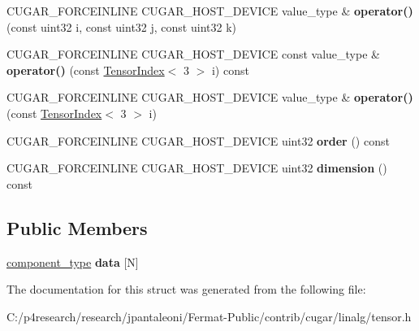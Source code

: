 \begin{DoxyCompactItemize}
\mbox{\label{structcugar_1_1_tensor_3_01_t_00_013_00_01_n_01_4_a6e31d653b9391e5c18a2f27902b9b14d}} 
C\+U\+G\+A\+R\+\_\+\+F\+O\+R\+C\+E\+I\+N\+L\+I\+NE C\+U\+G\+A\+R\+\_\+\+H\+O\+S\+T\+\_\+\+D\+E\+V\+I\+CE value\+\_\+type \& {\bfseries operator()} (const uint32 i, const uint32 j, const uint32 k)
\item 
\mbox{\label{structcugar_1_1_tensor_3_01_t_00_013_00_01_n_01_4_a2136b4f0c4645f271f2c01b002c7712b}} 
C\+U\+G\+A\+R\+\_\+\+F\+O\+R\+C\+E\+I\+N\+L\+I\+NE C\+U\+G\+A\+R\+\_\+\+H\+O\+S\+T\+\_\+\+D\+E\+V\+I\+CE const value\+\_\+type \& {\bfseries operator()} (const \hyperlink{structcugar_1_1_tensor_index}{Tensor\+Index}$<$ 3 $>$ i) const
\item 
\mbox{\label{structcugar_1_1_tensor_3_01_t_00_013_00_01_n_01_4_a9e03fbc67be50eda2cd3f2fed919641b}} 
C\+U\+G\+A\+R\+\_\+\+F\+O\+R\+C\+E\+I\+N\+L\+I\+NE C\+U\+G\+A\+R\+\_\+\+H\+O\+S\+T\+\_\+\+D\+E\+V\+I\+CE value\+\_\+type \& {\bfseries operator()} (const \hyperlink{structcugar_1_1_tensor_index}{Tensor\+Index}$<$ 3 $>$ i)
\item 
\mbox{\label{structcugar_1_1_tensor_3_01_t_00_013_00_01_n_01_4_a8689910f876c74634ca1fc6546e76784}} 
C\+U\+G\+A\+R\+\_\+\+F\+O\+R\+C\+E\+I\+N\+L\+I\+NE C\+U\+G\+A\+R\+\_\+\+H\+O\+S\+T\+\_\+\+D\+E\+V\+I\+CE uint32 {\bfseries order} () const
\item 
\mbox{\label{structcugar_1_1_tensor_3_01_t_00_013_00_01_n_01_4_ac1c9e5e3de21b570e2cdcb5c562c002f}} 
C\+U\+G\+A\+R\+\_\+\+F\+O\+R\+C\+E\+I\+N\+L\+I\+NE C\+U\+G\+A\+R\+\_\+\+H\+O\+S\+T\+\_\+\+D\+E\+V\+I\+CE uint32 {\bfseries dimension} () const
\end{DoxyCompactItemize}
\subsection*{Public Members}
\begin{DoxyCompactItemize}
\item 
\mbox{\label{structcugar_1_1_tensor_3_01_t_00_013_00_01_n_01_4_a38aa20e07fb5691bb6ed32d18125e5f1}} 
\hyperlink{structcugar_1_1_tensor_3_01_t_00_012_00_01_n_01_4}{component\+\_\+type} {\bfseries data} \mbox{[}N\mbox{]}
\end{DoxyCompactItemize}


The documentation for this struct was generated from the following file\+:\begin{DoxyCompactItemize}
\item 
C\+:/p4research/research/jpantaleoni/\+Fermat-\/\+Public/contrib/cugar/linalg/tensor.\+h\end{DoxyCompactItemize}
